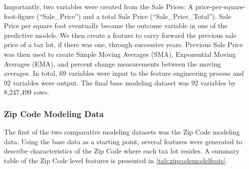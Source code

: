 \documentclass[12pt,]{article}
\begin{document}
Importantly, two variables were created from the Sale Prices: A
price-per-square-foot-figure (``Sale\_Price'') and a total Sale Price
(``Sale\_Price\_Total''). Sale Price per square foot eventually became
the outcome variable in one of the predictive models. We then create a
feature to carry forward the previous sale price of a tax lot, if there
was one, through successive years. Previous Sale Price was then used to
create Simple Moving Averages (SMA), Exponential Moving Averages (EMA),
and percent change measurements between the moving averages. In total,
69 variables were input to the feature engineering process and 92
variables were output. The final base modeling dataset was 92 variables
by 8,247,499 rows.

\hypertarget{zip-code-modeling-data}{%
\subsubsection{Zip Code Modeling Data}\label{zip-code-modeling-data}}

The first of the two comparative modeling datasets was the Zip Code
modeling data. Using the base data as a starting point, several features
were generated to describe characteristics of the Zip Code where each
tax lot resides. A summary table of the Zip Code level features is
presented in \ref{tab:zipcodemodelfeats}.
\end{document}
